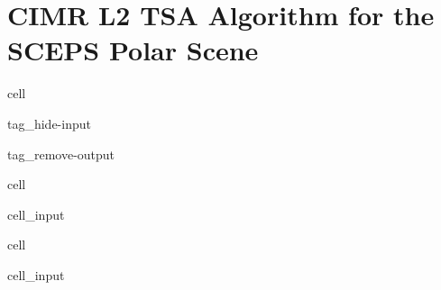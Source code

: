 \documentclass[letterpaper,10pt,english]{jupyterBook}
\begin{document}
\section{CIMR L2 TSA Algorithm for the SCEPS Polar Scene}
\label{\detokenize{algorithm/CIMR_L2_TSA_SCEPS:cimr-l2-tsa-algorithm-for-the-sceps-polar-scene}}\label{\detokenize{algorithm/CIMR_L2_TSA_SCEPS::doc}}
\begin{sphinxuseclass}{cell}
\begin{sphinxuseclass}{tag_hide-input}
\begin{sphinxuseclass}{tag_remove-output}
\end{sphinxuseclass}
\end{sphinxuseclass}
\end{sphinxuseclass}
\begin{sphinxuseclass}{cell}\begin{sphinxVerbatimInput}

\begin{sphinxuseclass}{cell_input}
\begin{sphinxVerbatim}[commandchars=\\\{\}]
  
  

    
  
\end{sphinxVerbatim}

\end{sphinxuseclass}\end{sphinxVerbatimInput}

\end{sphinxuseclass}
\begin{sphinxuseclass}{cell}\begin{sphinxVerbatimInput}

\begin{sphinxuseclass}{cell_input}
\begin{sphinxVerbatim}[commandchars=\\\{\}]
  \PYG{p}{[}\PYG{p}{]}
  \PYG{p}{[}\PYG{p}{]}               
\end{sphinxVerbatim}

\end{sphinxuseclass}\end{sphinxVerbatimInput}

\end{sphinxuseclass}
\end{document}
